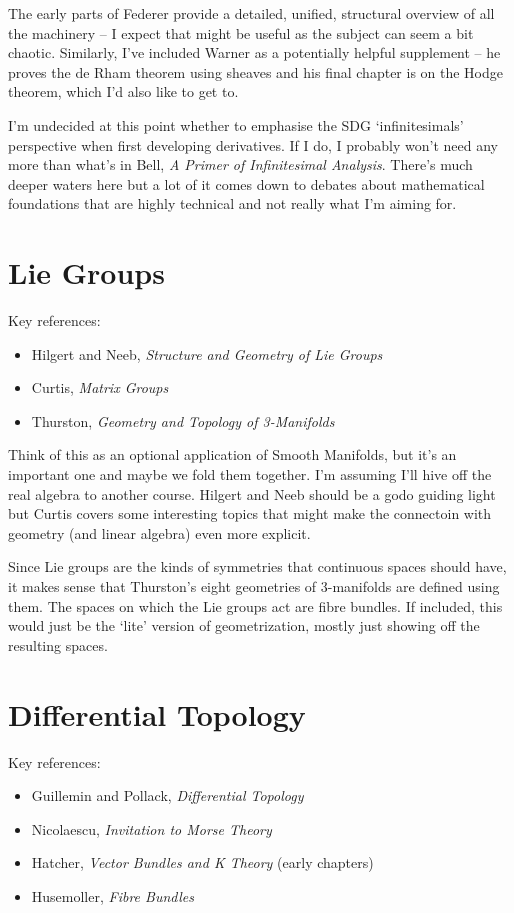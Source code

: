 \documentclass[article]{article}
\begin{document}
The early parts of Federer provide a detailed, unified, structural overview of all the machinery -- I expect that might be useful as the subject can seem a bit chaotic. Similarly, I've included Warner as a potentially helpful supplement -- he proves the de Rham theorem using sheaves and his final chapter is on the Hodge theorem, which I'd also like to get to.

I'm undecided at this point whether to emphasise the SDG `infinitesimals' perspective when first developing derivatives. If I do, I probably won't need any more than what's in Bell, \textit{A Primer of Infinitesimal Analysis}. There's much deeper waters here but a lot of it comes down to debates about mathematical foundations that are highly technical and not really what I'm aiming for.

\section{Lie Groups}
Key references:
\begin{itemize}
	\item{Hilgert and Neeb, \textit{Structure and Geometry of Lie Groups}}
	\item{Curtis, \textit{Matrix Groups}}
	\item{Thurston, \textit{Geometry and Topology of 3-Manifolds}}
\end{itemize}

Think of this as an optional application of Smooth Manifolds, but it's an important one and maybe we fold them together. I'm assuming I'll hive off the real algebra to another course. Hilgert and Neeb should be a godo guiding light but Curtis covers some interesting topics that might make the connectoin with geometry (and linear algebra) even more explicit. 

Since Lie groups are the kinds of symmetries that continuous spaces should have, it makes sense that Thurston's eight geometries of 3-manifolds are defined using them. The spaces on which the Lie groups act are fibre bundles. If included, this would just be the `lite' version of geometrization, mostly just showing off the resulting spaces.

\section{Differential Topology}

Key references:
\begin{itemize}
	\item{Guillemin and Pollack, \textit{Differential Topology}}
	\item{Nicolaescu, \textit{Invitation to Morse Theory}}
	\item{Hatcher, \textit{Vector Bundles and K Theory} (early chapters)}
	\item{Husemoller, \textit{Fibre Bundles}}
\end{itemize}
\end{document}
